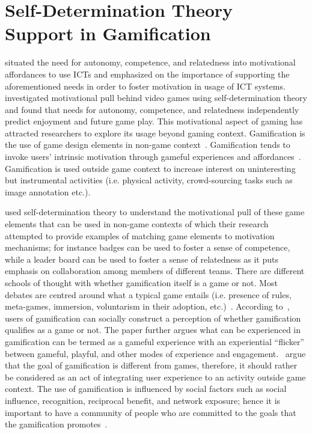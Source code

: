 \section{Self-Determination Theory Support in Gamification}
\cite{zhang2008motivational} situated the need for autonomy, competence, and relatedness into motivational affordances to use ICTs and emphasized on the importance of supporting the aforementioned needs in order to foster motivation in usage of ICT systems.~\cite{ryan2006:motivationalpull} investigated motivational pull behind video games using self-determination theory and found that needs for autonomy, competence, and relatedness independently predict enjoyment and future game play. This motivational aspect of gaming has attracted researchers to explore its usage beyond gaming context. Gamification is the use of game design elements in non-game context~\citep{deterding2011game}. Gamification tends to invoke users’ intrinsic motivation through gameful experiences and affordances~\citep{hamari2014persuasive}. Gamification is used outside game context to increase interest on uninteresting but instrumental activities (i.e. physical activity, crowd-sourcing tasks such as image annotation etc.).

\cite{sailer2013:psychological} used self-determination theory to understand the motivational pull of these game elements that can be used in non-game contexts of which their research attempted to provide examples of matching game elements to motivation mechanisms; for instance badges can be used to foster a sense of competence, while a leader board can be used to foster a sense of relatedness as it puts emphasis on collaboration among members of different teams. There are different schools of thought with whether gamification itself is a game or not. Most debates are centred around what a typical game entails (i.e. presence of rules, meta-games, immersion, voluntarism in their adoption, etc.)~\citep{seaborn2015:gamification}. According to~\cite{deterding2011game}, users of gamification can socially construct a perception of whether gamification qualifies as a game or not. The paper further argues what can be experienced in gamification can be termed as a gameful experience with an experiential ``flicker'' between gameful, playful, and other modes of experience and engagement.~\cite{seaborn2015:gamification} argue that the goal of gamification is different from games, therefore, it should rather be considered as an act of integrating user experience to an activity outside game context. The use of gamification is influenced by social factors such as social influence, recognition, reciprocal benefit, and network exposure; hence it is important to have a community of people who are committed to the goals that the gamification promotes~\citep{hamari2013social}.

